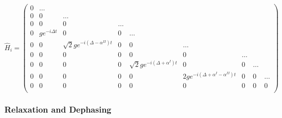 \begin{equation}
\hat{H}_i = \left(
			\begin{array}{lllllllll}
				0 & \hdots \\
				0 & 0 & \hdots \\
				0 & 0 & 0 & \hdots \\
				0 & ge^{-i\Delta t} & 0 & 0 & \hdots  \\
				0 & 0 & \sqrt{2}ge^{-i(\Delta-\alpha^{II}) t} & 0 & 0 & \hdots  \\
				0 & 0 & 0 & 0 & 0 & 0 & \hdots \\
				0 & 0 & 0 & 0 & \sqrt{2}ge^{-i(\Delta+\alpha^I) t} & 0 & 0 & \hdots \\
				0 & 0 & 0 & 0 & 0 & 2ge^{-i(\Delta+\alpha^{I}-\alpha^{II}) t} & 0 & 0 & \hdots \\
				0 & 0 & 0 & 0 & 0 & 0 & 0 & 0 & 0 \\
			\end{array}
		\right)
\end{equation}
%
\subsubsection{Relaxation and Dephasing}

